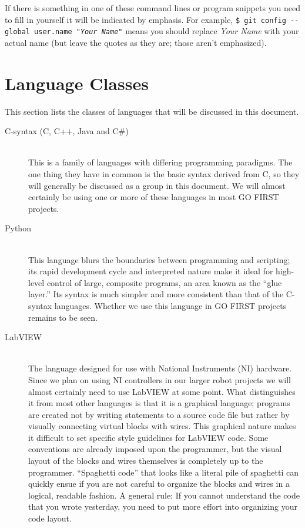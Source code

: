 \documentclass[12pt]{article}
\newcommand{\commandline}[1]{\texttt{\$ #1}}
\newcommand{\clloption}[1]{-{}-#1}
\newcommand{\toreplace}[1]{\emph{#1}}
\begin{document}
If there is something in one of these command lines or program snippets you need to fill in yourself it will be indicated by emphasis. For example, \commandline{git config \clloption{global} user.name "\toreplace{Your Name}"} means you should replace \toreplace{Your Name} with your actual name (but leave the quotes as they are; those aren't emphasized).
\section{Language Classes}
This section lists the classes of languages that will be discussed in this document.
\begin{description}
    \item[C-syntax (C, C++, Java and C\#)] \hfill \\
        This is a family of languages with differing programming paradigms. The one thing they have in common is the basic syntax derived from C, so they will generally be discussed as a group in this document. We will almost certainly be using one or more of these languages in most GO FIRST projects.
    \item[Python] \hfill \\
        This language blurs the boundaries between programming and scripting; its rapid development cycle and interpreted nature make it ideal for high-level control of large, composite programs, an area known as the ``glue layer.'' Its syntax is much simpler and more consistent than that of the C-syntax languages. Whether we use this language in GO FIRST projects remains to be seen.
    \item[LabVIEW] \hfill \\
        The language designed for use with National Instruments (NI) hardware. Since we plan on using NI controllers in our larger robot projects we will almost certainly need to use LabVIEW at some point. What distinguishes it from most other languages is that it is a graphical language; programs are created not by writing statements to a source code file but rather by visually connecting virtual blocks with wires. This graphical nature makes it difficult to set specific style guidelines for LabVIEW code. Some conventions are already imposed upon the programmer, but the visual layout of the blocks and wires themselves is completely up to the programmer. ``Spaghetti code'' that looks like a literal pile of spaghetti can quickly ensue if you are not careful to organize the blocks and wires in a logical, readable fashion. A general rule: If you cannot understand the code that you wrote yesterday, you need to put more effort into organizing your code layout.
\end{description}
\end{document}
